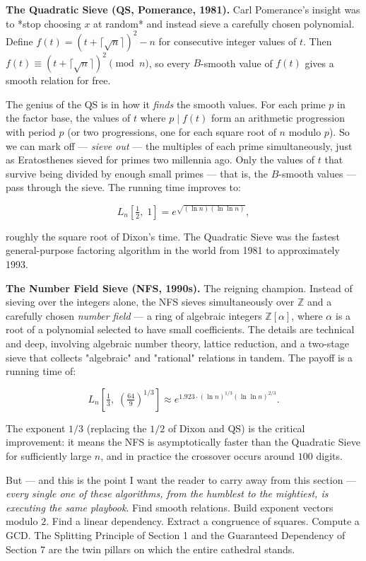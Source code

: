 \documentclass[11pt,openright,twoside]{book}
\theoremstyle{definition}
\begin{document}
\textbf{The Quadratic Sieve (QS, Pomerance, 1981).} Carl Pomerance's insight was to *stop choosing $x$ at random* and instead sieve a carefully chosen polynomial. Define $f(t) = (t + \lceil \sqrt{n} \rceil)^2 - n$ for consecutive integer values of $t$. Then $f(t) \equiv (t + \lceil \sqrt{n} \rceil)^2 \pmod{n}$, so every $B$-smooth value of $f(t)$ gives a smooth relation for free.

The genius of the QS is in how it \textit{finds} the smooth values. For each prime $p$ in the factor base, the values of $t$ where $p \mid f(t)$ form an arithmetic progression with period $p$ (or two progressions, one for each square root of $n$ modulo $p$). So we can mark off --- \textit{sieve out} --- the multiples of each prime simultaneously, just as Eratosthenes sieved for primes two millennia ago. Only the values of $t$ that survive being divided by enough small primes --- that is, the $B$-smooth values --- pass through the sieve. The running time improves to:

\[L_n\!\left[\tfrac{1}{2}, \; 1\right] = e^{\sqrt{(\ln n)(\ln \ln n)}},\]

roughly the square root of Dixon's time. The Quadratic Sieve was the fastest general-purpose factoring algorithm in the world from 1981 to approximately 1993.

\textbf{The Number Field Sieve (NFS, 1990s).} The reigning champion. Instead of sieving over the integers alone, the NFS sieves simultaneously over $\mathbb{Z}$ and a carefully chosen \textit{number field} --- a ring of algebraic integers $\mathbb{Z}[\alpha]$, where $\alpha$ is a root of a polynomial selected to have small coefficients. The details are technical and deep, involving algebraic number theory, lattice reduction, and a two-stage sieve that collects "algebraic" and "rational" relations in tandem. The payoff is a running time of:

\[L_n\!\left[\tfrac{1}{3}, \; \left(\tfrac{64}{9}\right)^{\!1/3}\right] \approx e^{1.923 \cdot (\ln n)^{1/3} (\ln \ln n)^{2/3}}.\]

The exponent $1/3$ (replacing the $1/2$ of Dixon and QS) is the critical improvement: it means the NFS is asymptotically faster than the Quadratic Sieve for sufficiently large $n$, and in practice the crossover occurs around $100$ digits.

But --- and this is the point I want the reader to carry away from this section --- \textit{every single one of these algorithms, from the humblest to the mightiest, is executing the same playbook}. Find smooth relations. Build exponent vectors modulo $2$. Find a linear dependency. Extract a congruence of squares. Compute a GCD. The Splitting Principle of Section 1 and the Guaranteed Dependency of Section 7 are the twin pillars on which the entire cathedral stands.
\end{document}
